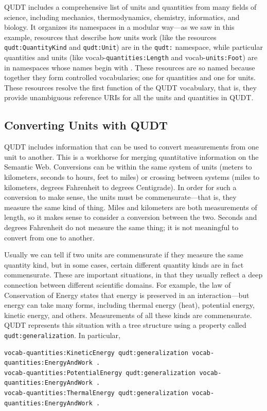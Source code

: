 QUDT includes a comprehensive list of units and quantities from many
fields of science, including mechanics, thermodynamics, chemistry,
informatics, and biology. It organizes its namespaces in a modular
way---as we saw in this example, resources that describe how units work
(like the resources \texttt{qudt:QuantityKind} and \texttt{qudt:Unit}) are in the \texttt{qudt:}
namespace, while particular quantities and units (like
vocab-\texttt{quantities:Length} and vocab-\texttt{units:Foot}) are in namespaces whose
names begin with . These resources are so named because together
they form controlled vocabularies; one for quantities and one for units.
These resources resolve the first function of the QUDT vocabulary, that
is, they provide unambiguous reference URIs for all the units and
quantities in QUDT.

\subsection{Converting Units with QUDT}

QUDT includes information that can be used to convert measurements from
one unit to another. This is a workhorse for merging quantitative
information on the Semantic Web. Conversions can be within the same
system of units (meters to kilometers, seconds to hours, feet to miles)
or crossing between systems (miles to kilometers, degrees Fahrenheit to
degrees Centigrade). In order for such a conversion to make sense, the
units must be commensurate---that is, they measure the same kind of
thing. Miles and kilometers are both measurements of length, so it makes
sense to consider a conversion between the two. Seconds and degrees
Fahrenheit do not measure the same thing; it is not meaningful to
convert from one to another.

Usually we can tell if two units are commensurate if they measure the
same quantity kind, but in some cases, certain different quantity kinds
are in fact commensurate. These are important situations, in that they
usually reflect a deep connection between different scientific domains.
For example, the law of Conservation of Energy states that energy is
preserved in an interaction---but energy can take many forms, including
thermal energy (heat), potential energy, kinetic energy, and others.
Measurements of all these kinds are commensurate. QUDT represents this
situation with a tree structure using a property called
\texttt{qudt:generalization}. In particular,

\begin{lstlisting}
vocab-quantities:KineticEnergy qudt:generalization vocab-quantities:EnergyAndWork .
vocab-quantities:PotentialEnergy qudt:generalization vocab-quantities:EnergyAndWork .
vocab-quantities:ThermalEnergy qudt:generalization vocab-quantities:EnergyAndWork .
\end{lstlisting}

